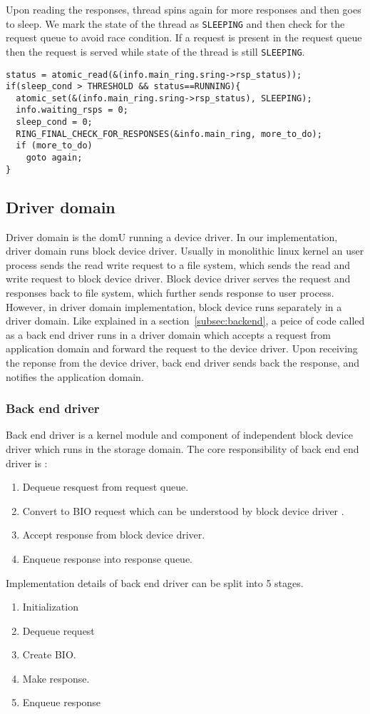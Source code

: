 Upon reading the responses, thread spins again for more responses and then goes to sleep.    
We mark the state of the thread as \texttt{SLEEPING} and then check for the request queue to avoid race condition. If a request is present in the request queue then the request is served while state of the thread is still \texttt{SLEEPING}.
\begin{verbatim}
status = atomic_read(&(info.main_ring.sring->rsp_status));
if(sleep_cond > THRESHOLD && status==RUNNING){
  atomic_set(&(info.main_ring.sring->rsp_status), SLEEPING);
  info.waiting_rsps = 0;
  sleep_cond = 0;
  RING_FINAL_CHECK_FOR_RESPONSES(&info.main_ring, more_to_do);
  if (more_to_do)
    goto again;
}
\end{verbatim}

\subsection{Driver domain}

Driver domain is the domU running a device driver. In our implementation, driver domain runs block device driver. Usually in monolithic linux kernel an user process sends the read write request to a file system, which sends the read and write request to block device driver. Block device driver serves the request and responses back to file system, which further sends response to user process.
\\  
However, in driver domain implementation, block device runs separately in a driver domain. Like explained in a section~\ref{subsec:backend}, a peice of code called as a back end driver runs in a driver domain which accepts a request from application domain and forward the request to the device driver. Upon receiving the reponse from the device driver, back end driver sends back the response, and notifies the application domain.

\subsubsection*{Back end driver}

Back end driver is a kernel module and component of independent block device driver which runs in the storage domain. The core responsibility of back end end driver is :
\begin{enumerate}
\item Dequeue resquest from request queue.
\item Convert to BIO request which can be understood by block device driver .
\item Accept response from block device driver.
\item Enqueue response into response queue.
\end{enumerate}
Implementation details of back end driver can be split into 5 stages. 
\begin{enumerate}
\item Initialization
\item Dequeue request
\item Create BIO. 
\item Make response.
\item Enqueue response
\end{enumerate}

